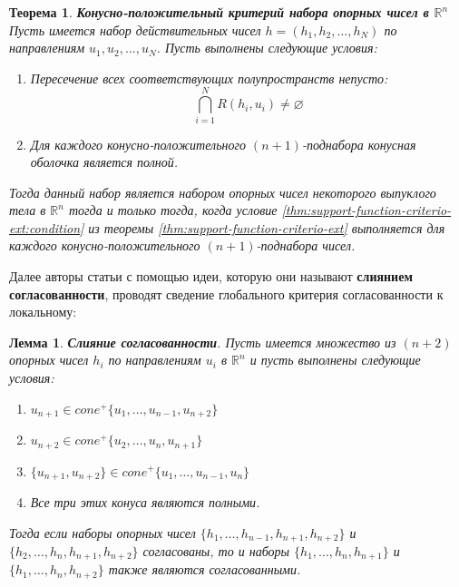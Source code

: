 \documentclass[a4paper, 12pt, titlepage]{article}
\theoremstyle{definition}
\theoremstyle{plain}
\newtheorem{SmartTheorem}{Теорема}
\theoremstyle{plain}
\newtheorem{SmartLemma}{Лемма}
\begin{document}
\begin{SmartTheorem}
 \label{thm:positive-cone-consistency}
 \textbf{Конусно-положительный критерий набора опорных чисел в $\mathbb{R}^{n}$}
 Пусть имеется набор действительных чисел $h = (h_{1}, h_{2}, \ldots, h_{N})$ по
 направлениям $u_{1}, u_{2}, \ldots, u_{N}$. Пусть выполнены следующие
 условия:
 \begin{enumerate}
  \item Пересечение всех соответствующих полупространств непусто:
  \begin{equation}
   \bigcap \limits_{i = 1}^{N} R(h_{i}, u_{i}) \neq \varnothing
  \end{equation}
  \item Для каждого конусно-положительного $(n + 1)$-поднабора конусная оболочка
  является полной.
 \end{enumerate}

 Тогда данный набор является набором опорных чисел некоторого выпуклого тела в
 $\mathbb{R}^{n}$ тогда и только тогда, когда условие
 \ref{thm:support-function-criterio-ext:condition} из теоремы
 \ref{thm:support-function-criterio-ext} выполняется для каждого
 конусно-положительного $(n + 1)$-поднабора чисел.
\end{SmartTheorem}

Далее авторы статьи с помощью идеи, которую они называют \textbf{слиянием
согласованности}, проводят сведение глобального критерия согласованности к
локальному:

\begin{SmartLemma}
 \label{lem:consistency-merging}
 \textbf{Слияние согласованности}.
 Пусть имеется множество из $(n + 2)$ опорных чисел $h_{i}$ по направлениям
 $u_{i}$ в $\mathbb{R}^{n}$ и пусть выполнены следующие условия:

 \begin{enumerate}
  \item $u_{n + 1} \in cone^{+}\{u_{1}, \ldots, u_{n - 1}, u_{n + 2}\}$
  \item $u_{n + 2} \in cone^{+}\{u_{2}, \ldots, u_{n}, u_{n + 1}\}$
  \item $\{u_{n + 1}, u_{n + 2}\} \in cone^{+}\{u_{1}, \ldots, u_{n - 1},
u_{n}\}$
  \item Все три этих конуса являются полными.
 \end{enumerate}

 Тогда если наборы опорных чисел
 $\{h_{1}, \ldots, h_{n - 1}, h_{n + 1}, h_{n + 2}\}$ и
 $\{h_{2}, \ldots, h_{n}, h_{n + 1}, h_{n + 2}\}$ согласованы, то и наборы
 $\{h_{1}, \ldots, h_{n}, h_{n + 1}\}$ и
 $\{h_{1}, \ldots, h_{n}, h_{n + 2}\}$ также являются согласованными.
\end{SmartLemma}
\end{document}
